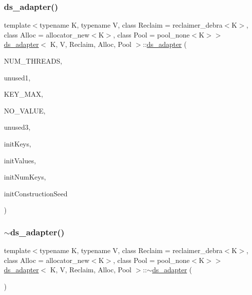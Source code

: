 \mbox{\label{classds__adapter_a975d60baff60ec11ddb54121b689e86e}} 
\subsubsection{\texorpdfstring{ds\+\_\+adapter()}{ds\_adapter()}\hspace{0.1cm}{\footnotesize\ttfamily [17/27]}}
{\footnotesize\ttfamily template$<$typename K, typename V, class Reclaim = reclaimer\+\_\+debra$<$\+K$>$, class Alloc = allocator\+\_\+new$<$\+K$>$, class Pool = pool\+\_\+none$<$\+K$>$$>$ \\
\hyperlink{classds__adapter}{ds\+\_\+adapter}$<$ K, V, Reclaim, Alloc, Pool $>$\+::\hyperlink{classds__adapter}{ds\+\_\+adapter} (\begin{DoxyParamCaption}\item[{const int}]{N\+U\+M\+\_\+\+T\+H\+R\+E\+A\+DS,  }\item[{const K \&}]{unused1,  }\item[{const K \&}]{K\+E\+Y\+\_\+\+M\+AX,  }\item[{const V \&}]{N\+O\+\_\+\+V\+A\+L\+UE,  }\item[{\hyperlink{classRandomFNV1A}{Random\+F\+N\+V1A} $\ast$const}]{unused3,  }\item[{const K $\ast$const}]{init\+Keys,  }\item[{const V $\ast$const}]{init\+Values,  }\item[{const size\+\_\+t}]{init\+Num\+Keys,  }\item[{const size\+\_\+t}]{init\+Construction\+Seed }\end{DoxyParamCaption})\hspace{0.3cm}{\ttfamily [inline]}}

\mbox{\label{classds__adapter_a366f46dd39d59f2d4a147589f5fd98e3}} 
\subsubsection{\texorpdfstring{$\sim$ds\+\_\+adapter()}{~ds\_adapter()}\hspace{0.1cm}{\footnotesize\ttfamily [16/26]}}
{\footnotesize\ttfamily template$<$typename K, typename V, class Reclaim = reclaimer\+\_\+debra$<$\+K$>$, class Alloc = allocator\+\_\+new$<$\+K$>$, class Pool = pool\+\_\+none$<$\+K$>$$>$ \\
\hyperlink{classds__adapter}{ds\+\_\+adapter}$<$ K, V, Reclaim, Alloc, Pool $>$\+::$\sim$\hyperlink{classds__adapter}{ds\+\_\+adapter} (\begin{DoxyParamCaption}{ }\end{DoxyParamCaption})\hspace{0.3cm}{\ttfamily [inline]}}

